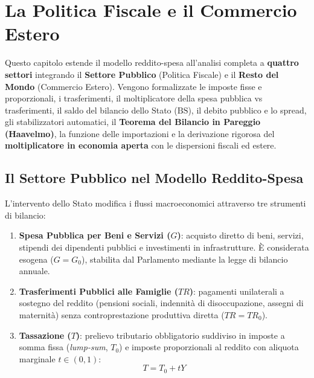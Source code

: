 \chapter{La Politica Fiscale e il Commercio Estero}
\label{chap:politica_fiscale_commercio_estero}

\begin{tcolorbox}[colback=navyblue!5!white, colframe=navyblue, title=\textbf{Quadro Concettuale del Capitolo}]
Questo capitolo estende il modello reddito-spesa all'analisi completa a \textbf{quattro settori} integrando il \textbf{Settore Pubblico} (Politica Fiscale) e il \textbf{Resto del Mondo} (Commercio Estero). Vengono formalizzate le imposte fisse e proporzionali, i trasferimenti, il moltiplicatore della spesa pubblica vs trasferimenti, il saldo del bilancio dello Stato ($\mathrm{BS}$), il debito pubblico e lo spread, gli stabilizzatori automatici, il \textbf{Teorema del Bilancio in Pareggio (Haavelmo)}, la funzione delle importazioni e la derivazione rigorosa del \textbf{moltiplicatore in economia aperta} con le dispersioni fiscali ed estere.
\end{tcolorbox}

\section{Il Settore Pubblico nel Modello Reddito-Spesa}

L'intervento dello Stato modifica i flussi macroeconomici attraverso tre strumenti di bilancio:
\begin{enumerate}
    \item \textbf{Spesa Pubblica per Beni e Servizi ($G$)}: acquisto diretto di beni, servizi, stipendi dei dipendenti pubblici e investimenti in infrastrutture. È considerata esogena ($G = G_0$), stabilita dal Parlamento mediante la legge di bilancio annuale.
    \item \textbf{Trasferimenti Pubblici alle Famiglie ($TR$)}: pagamenti unilaterali a sostegno del reddito (pensioni sociali, indennità di disoccupazione, assegni di maternità) senza controprestazione produttiva diretta ($TR = TR_0$).
    \item \textbf{Tassazione ($T$)}: prelievo tributario obbligatorio suddiviso in imposte a somma fissa (\textit{lump-sum}, $T_0$) e imposte proporzionali al reddito con aliquota marginale $t \in (0, 1)$:
    \begin{equation}
        T = T_0 + t Y
    \end{equation}
\end{enumerate}

